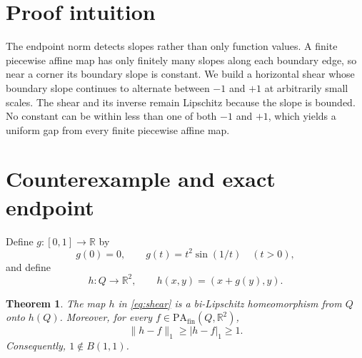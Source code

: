 \documentclass[10pt]{article}
\newtheorem{theorem}{Theorem}
\newcommand{\R}{\mathbb R}
\newcommand{\pa}{\mathrm{PA}_{\mathrm{fin}}}
\begin{document}
\section{Proof intuition}

The endpoint norm detects slopes rather than only function values.  A finite
piecewise affine map has only finitely many slopes along each boundary edge,
so near a corner its boundary slope is constant.  We build a horizontal
shear whose boundary slope continues to alternate between $-1$ and $+1$ at
arbitrarily small scales.  The shear and its inverse remain Lipschitz because
the slope is bounded.  No constant can be within less than one of both
$-1$ and $+1$, which yields a uniform gap from every finite piecewise affine
map.

\section{Counterexample and exact endpoint}

Define $g:[0,1]\to\R$ by
\[
 g(0)=0,\qquad g(t)=t^2\sin(1/t)\quad(t>0),
\]
and define
\begin{equation}
 h:Q\longrightarrow\R^2,\qquad h(x,y)=(x+g(y),y).
 \label{eq:shear}
\end{equation}

\begin{theorem}
\label{thm:gap}
The map $h$ in \eqref{eq:shear} is a bi-Lipschitz homeomorphism from $Q$
onto $h(Q)$.  Moreover, for every $f\in\pa(Q,\R^2)$,
\begin{equation}
 \|h-f\|_1\geq |h-f|_1\geq1.
 \label{eq:gap}
\end{equation}
Consequently, $1\notin B(1,1)$.
\end{theorem}
\end{document}
